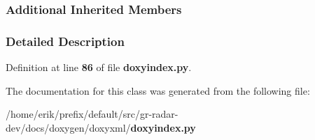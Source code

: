 \subsubsection*{Additional Inherited Members}


\subsubsection{Detailed Description}


Definition at line {\bf 86} of file {\bf doxyindex.\+py}.



The documentation for this class was generated from the following file\+:\begin{DoxyCompactItemize}
\item 
/home/erik/prefix/default/src/gr-\/radar-\/dev/docs/doxygen/doxyxml/{\bf doxyindex.\+py}\end{DoxyCompactItemize}
